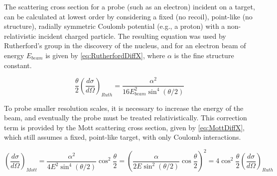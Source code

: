         
        

        


        The scattering cross section for a probe (such as an electron) incident on a target, can be calculated at lowest order by considering a fixed (no recoil), point-like (no structure),  radially symmetric Coulomb potential (e.g., a proton) with a non-relativistic incident charged particle. The resulting equation was used by Rutherford's group in the discovery of the nucleus, and for an electron beam of energy  $E_{beam}$ is given by \eqref{eq:RutherfordDiffX}, where $\alpha$ is the fine structure constant.

            \begin{equation}\label{eq:RutherfordDiffX}
                {\frac{\theta}{2}}(\frac{d\sigma}{d\Omega})_{Ruth} = \frac{\alpha^2}{16E^2_{beam}\sin^4{(\theta/2)}}
            \end{equation}

        To probe smaller resolution scales, it is necessary to increase the energy of the beam, and eventually the probe must be treated relativistically. This correction term is provided by the Mott scattering cross section, given by \eqref{eq:MottDiffX}, which still assumes a fixed, point-like target, with only Coulomb interactions.
            
                \begin{equation}\label{eq:MottDiffX}
                     (\frac{d\sigma}{d\Omega})_{Mott} = \frac{\alpha^2}{4E^2\sin^4{(\theta/2)}}\cos^2{\frac{\theta}{2}} = \left( \frac{\alpha}{2E\sin^2{(\theta/2)}}\cos{\frac{\theta}{2}} \right)^2 = 4\cos^2{\frac{\theta}{2}}(\frac{d\sigma}{d\Omega})_{Ruth}
                \end{equation}
        

